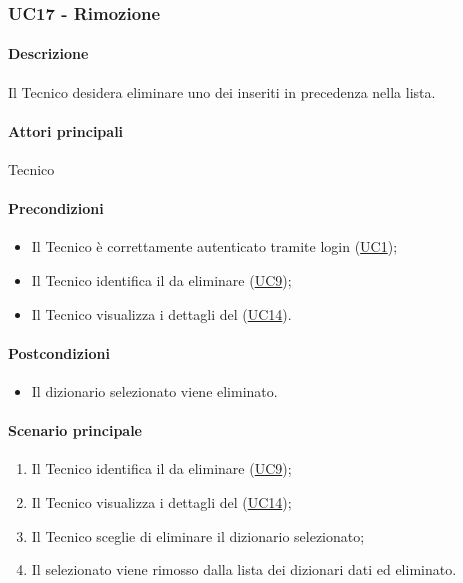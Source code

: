 \subsubsection{UC17 - Rimozione }\label{UC17}
\paragraph*{Descrizione}
Il Tecnico desidera eliminare uno dei  inseriti in precedenza nella lista.

\paragraph*{Attori principali}
Tecnico

\paragraph*{Precondizioni}
\begin{itemize}
  \item Il Tecnico è correttamente autenticato tramite login (\hyperref[UC1]{UC1});
  \item Il Tecnico identifica il  da eliminare (\hyperref[UC9]{UC9});
  \item Il Tecnico visualizza i dettagli del  (\hyperref[UC14]{UC14}).  
\end{itemize}

\paragraph*{Postcondizioni}
\begin{itemize}
  \item Il dizionario selezionato viene eliminato.
\end{itemize}

\paragraph*{Scenario principale}
\begin{enumerate}
  \item Il Tecnico identifica il  da eliminare (\hyperref[UC9]{UC9});
  \item Il Tecnico visualizza i dettagli del  (\hyperref[UC14]{UC14});  
  \item Il Tecnico sceglie di eliminare il dizionario selezionato;
  \item Il  selezionato viene rimosso dalla lista dei dizionari dati ed eliminato.  
\end{enumerate}

